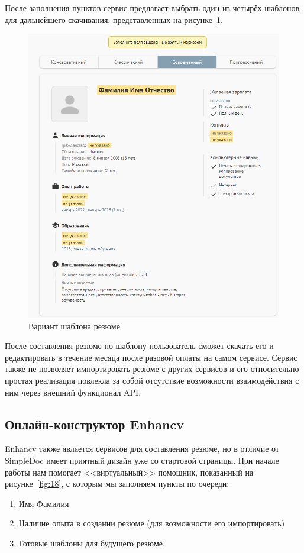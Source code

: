 \documentclass[master, och, diploma]{SCWorks}
\begin{document}
После заполнения пунктов сервис предлагает выбрать один из четырёх шаблонов для дальнейшего скачивания, представленных на рисунке~\ref{fig:16}.
\begin{figure}[!ht]
    \centering
    \includegraphics[width=12cm]{images/image4.png}
    \caption{\label{fig:16}%
        Вариант шаблона резюме}
\end{figure}

После составления резюме по шаблону пользователь сможет скачать его и редактировать в течение месяца после разовой оплаты на самом сервисе. Сервис также не позволяет импортировать резюме с других сервисов и его относительно простая реализация повлекла за собой отсутствие возможности взаимодействия с ним через внешний функционал API.



\subsection{Онлайн-конструктор Enhancv}
Enhancv также является сервисов для составления резюме, но в отличие от SimpleDoc имеет приятный дизайн уже со стартовой страницы. При начале работы нам помогает <<виртуальный>> помощник, показанный на рисунке~\ref{fig:18}, с которым мы заполняем пункты по очереди:
\begin{enumerate}
    \item Имя Фамилия
    \item Наличие опыта в создании резюме (для возможности его импортировать)
    \item Готовые шаблоны для будущего резюме.
\end{enumerate}
\end{document}
